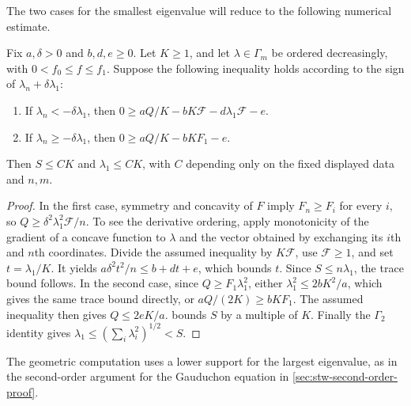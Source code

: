The two cases for the smallest eigenvalue
will reduce to the following numerical estimate.

\begin{proposition}\label{hessian:conditional-maximal-eigenvalue-bound}
Fix $a,\delta>0$ and $b,d,e\geq0$. Let $K\geq1$, and let $\lambda\in\Gamma_m$ be ordered decreasingly, with $0<f_0\leq f\leq f_1$. Suppose the following inequality holds according to the sign of $\lambda_n+\delta\lambda_1$:
\begin{enumerate}
\item If $\lambda_n<-\delta\lambda_1$, then $0\geq aQ/K-bK\mathcal F-d\lambda_1\mathcal F-e$.
\item If $\lambda_n\geq-\delta\lambda_1$, then $0\geq aQ/K-bKF_1-e$.
\end{enumerate}
Then $S\leq CK$ and $\lambda_1\leq CK$, with $C$ depending only on the fixed displayed data and $n,m$.
\end{proposition}
\begin{proof}
In the first case, symmetry and concavity of $F$ imply $F_n\geq F_i$ for every $i$, so $Q\geq\delta^2\lambda_1^2\mathcal F/n$. To see the derivative ordering, apply monotonicity of the gradient of a concave function to $\lambda$ and the vector obtained by exchanging its $i$th and $n$th coordinates. Divide the assumed inequality by $K\mathcal F$, use $\mathcal F\geq1$, and set $t=\lambda_1/K$. It yields $a\delta^2t^2/n\leq b+dt+e$, which bounds $t$. Since $S\leq n\lambda_1$, the trace bound follows.
In the second case, since $Q\geq F_1\lambda_1^2$, either $\lambda_1^2\leq2bK^2/a$, which gives the same trace bound directly, or $aQ/(2K)\geq bKF_1$. The assumed inequality then gives $Q\leq2eK/a$.  bounds $S$ by a multiple of $K$. Finally the $\Gamma_2$ identity gives $\lambda_1\leq(\sum_i\lambda_i^2)^{1/2}<S$.
\end{proof}

The geometric computation uses a lower support for the largest
eigenvalue, as in the second-order argument for the Gauduchon equation
in \cref{sec:stw-second-order-proof}.


